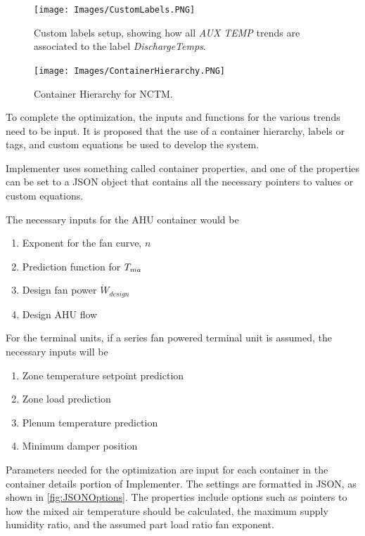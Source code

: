 \begin{figure}
\centering
\texttt{[image: Images/CustomLabels.PNG]}
\caption{Custom labels setup, showing how all \textit{AUX TEMP} trends
are associated to the label \textit{DischargeTemps}. }
\label{fig:CustomLabels}
\end{figure}

\begin{figure}
\centering
\texttt{[image: Images/ContainerHierarchy.PNG]}
\caption{Container Hierarchy for NCTM.}
\label{fig:ContainerHierarchy}
\end{figure}

To complete the optimization, the inputs and functions for the
various trends need to be input. It is proposed that the use of a
container hierarchy, labels or tags, and custom equations be used to
develop the system.

Implementer uses something called container properties, and one of the
properties can be set to a JSON object that contains all the necessary
pointers to values or custom equations.

The necessary inputs for the AHU container would be 
\begin{enumerate}
    \item Exponent for the fan curve, \(n\)
    \item Prediction function for \(T_{ma}{}\) 
    \item Design fan power \(\dot{W}_{design}\)
    \item Design AHU flow 
\end{enumerate}
For the terminal units, if a series fan powered
terminal unit is assumed, the necessary inputs will be
\begin{enumerate}
    \item Zone temperature setpoint prediction
    \item Zone load prediction
    \item Plenum temperature prediction
    \item Minimum damper position
\end{enumerate}

Parameters needed for the optimization are input for each container in
the container details portion of Implementer. The settings are formatted
in JSON, as shown in \figref{} \ref{fig:JSONOptions}. The properties
include options such as pointers to how the mixed air temperature
should be calculated, the maximum supply humidity ratio, and the
assumed part load ratio fan exponent. 

